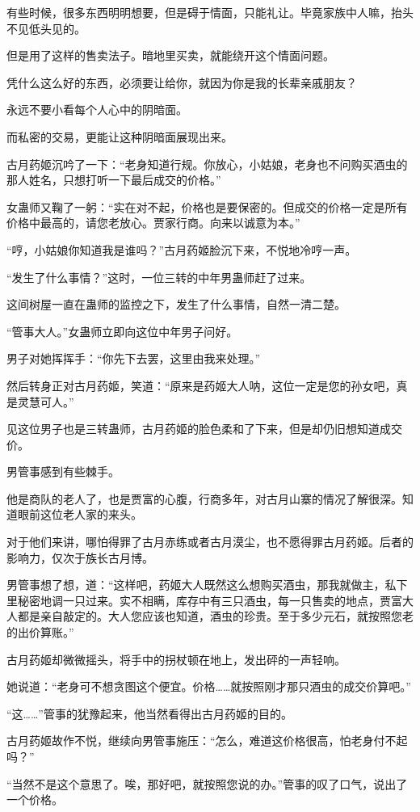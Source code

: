 \begin{this_body}
有些时候，很多东西明明想要，但是碍于情面，只能礼让。毕竟家族中人嘛，抬头不见低头见的。

但是用了这样的售卖法子。暗地里买卖，就能绕开这个情面问题。

凭什么这么好的东西，必须要让给你，就因为你是我的长辈亲戚朋友？

永远不要小看每个人心中的阴暗面。

而私密的交易，更能让这种阴暗面展现出来。

古月药姬沉吟了一下：“老身知道行规。你放心，小姑娘，老身也不问购买酒虫的那人姓名，只想打听一下最后成交的价格。”

女蛊师又鞠了一躬：“实在对不起，价格也是要保密的。但成交的价格一定是所有价格中最高的，请您老放心。贾家行商。向来以诚意为本。”

“哼，小姑娘你知道我是谁吗？”古月药姬脸沉下来，不悦地冷哼一声。

“发生了什么事情？”这时，一位三转的中年男蛊师赶了过来。

这间树屋一直在蛊师的监控之下，发生了什么事情，自然一清二楚。

“管事大人。”女蛊师立即向这位中年男子问好。

男子对她挥挥手：“你先下去罢，这里由我来处理。”

然后转身正对古月药姬，笑道：“原来是药姬大人呐，这位一定是您的孙女吧，真是灵慧可人。”

见这位男子也是三转蛊师，古月药姬的脸色柔和了下来，但是却仍旧想知道成交价。

男管事感到有些棘手。

他是商队的老人了，也是贾富的心腹，行商多年，对古月山寨的情况了解很深。知道眼前这位老人家的来头。

对于他们来讲，哪怕得罪了古月赤练或者古月漠尘，也不愿得罪古月药姬。后者的影响力，仅次于族长古月博。

男管事想了想，道：“这样吧，药姬大人既然这么想购买酒虫，那我就做主，私下里秘密地调一只过来。实不相瞒，库存中有三只酒虫，每一只售卖的地点，贾富大人都是亲自敲定的。大人您应该也知道，酒虫的珍贵。至于多少元石，就按照您老的出价算账。”

古月药姬却微微摇头，将手中的拐杖顿在地上，发出砰的一声轻响。

她说道：“老身可不想贪图这个便宜。价格……就按照刚才那只酒虫的成交价算吧。”

“这……”管事的犹豫起来，他当然看得出古月药姬的目的。

古月药姬故作不悦，继续向男管事施压：“怎么，难道这价格很高，怕老身付不起吗？”

“当然不是这个意思了。唉，那好吧，就按照您说的办。”管事的叹了口气，说出了一个价格。


\end{this_body}
